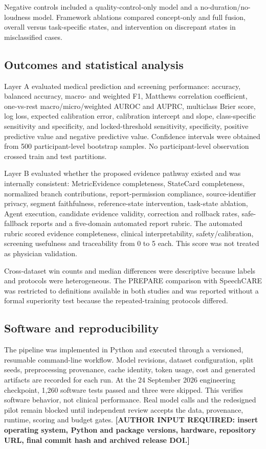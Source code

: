 \documentclass[pdflatex,sn-nature]{sn-jnl}
\begin{document}
Negative controls included a quality-control-only model and a no-duration/no-loudness model. Framework ablations compared concept-only and full fusion, overall versus task-specific states, and intervention on discrepant states in misclassified cases.

\subsection{Outcomes and statistical analysis}

Layer A evaluated medical prediction and screening performance: accuracy, balanced accuracy, macro- and weighted F1, Matthews correlation coefficient, one-vs-rest macro/micro/weighted AUROC and AUPRC, multiclass Brier score, log loss, expected calibration error, calibration intercept and slope, class-specific sensitivity and specificity, and locked-threshold sensitivity, specificity, positive predictive value and negative predictive value. Confidence intervals were obtained from 500 participant-level bootstrap samples. No participant-level observation crossed train and test partitions.

Layer B evaluated whether the proposed evidence pathway existed and was internally consistent: MetricEvidence completeness, StateCard completeness, normalized branch contributions, report-permission compliance, source-identifier privacy, segment faithfulness, reference-state intervention, task-state ablation, Agent execution, candidate evidence validity, correction and rollback rates, safe-fallback reports and a five-domain automated report rubric. The automated rubric scored evidence completeness, clinical interpretability, safety/calibration, screening usefulness and traceability from 0 to 5 each. This score was not treated as physician validation.

Cross-dataset win counts and median differences were descriptive because labels and protocols were heterogeneous. The PREPARE comparison with SpeechCARE was restricted to definitions available in both studies and was reported without a formal superiority test because the repeated-training protocols differed.

\subsection{Software and reproducibility}

The pipeline was implemented in Python and executed through a versioned, resumable command-line workflow. Model revisions, dataset configuration, split seeds, preprocessing provenance, cache identity, token usage, cost and generated artifacts are recorded for each run. At the 24 September 2026 engineering checkpoint, 1,260 software tests passed and three were skipped. This verifies software behavior, not clinical performance. Real model calls and the redesigned pilot remain blocked until independent review accepts the data, provenance, runtime, scoring and budget gates. \textbf{[AUTHOR INPUT REQUIRED: insert operating system, Python and package versions, hardware, repository URL, final commit hash and archived release DOI.]}
\end{document}
